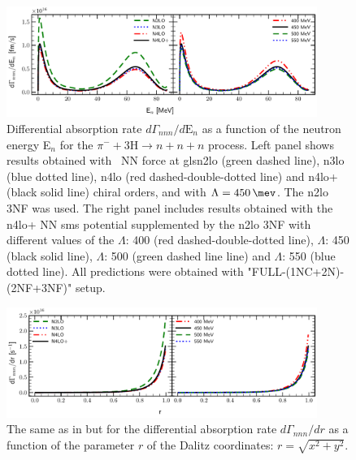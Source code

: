     \begin{figure}[h]
        \begin{center}
        \includegraphics[width=0.9\textwidth]{PlotData/PION/Dalitz_maps/figures/3H_dGdEn.pdf}
        \end{center}
        \caption{Differential absorption rate $d\Gamma_{nnn} /d\text{E}_n$ 
        as a function of the neutron energy E$_n$ for the 
        $\pi^- + 3\text{H} \rightarrow n + n + n$ process.
        Left panel shows results obtained with \ NN force at gls{n2lo} (green dashed line),
        \gls{n3lo} (blue dotted line), \gls{n4lo} (red dashed-double-dotted line)
        and \gls{n4lo+} (black solid line) chiral orders, and with $\Lambda = \SI{450}{\mev}$.
        The \gls{n2lo} 3NF was used.
        The right panel includes results obtained with the \gls{n4lo+} NN \gls{sms} potential
        supplemented by the \gls{n2lo} 3NF
        with different values of the $\Lambda$: \SI{400}{\mev} (red dashed-double-dotted line),
        $\Lambda$: \SI{450}{\mev} (black solid line),
        $\Lambda$: \SI{500}{\mev} (green dashed line line) and
        $\Lambda$: \SI{550}{\mev} (blue dotted line).
        All predictions were obtained with "FULL-(1NC+2N)-(2NF+3NF)" setup.}
        \label{pion_dGdEn_3H}
    \end{figure}

    \begin{figure}[h]
        \begin{center}
        \includegraphics[width=0.9\textwidth]{PlotData/PION/Dalitz_maps/figures/3H_dGdr.pdf}
        \end{center}
        \caption{The same as in  but for the differential absorption rate $d\Gamma_{nnn} /dr$
        as a function of the parameter $r$ of the Dalitz coordinates: $r = \sqrt{x^2 + y^2}$.}
        \label{pion_dGdr_3H}
    \end{figure}


